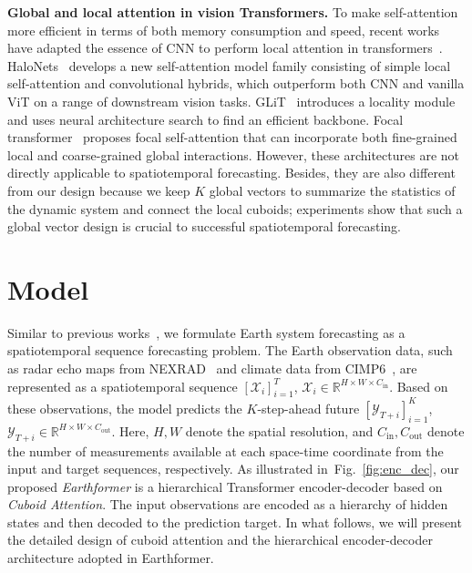 \documentclass{article}
\newcommand{\figref}[1]{Fig.~\ref{#1}}
\renewcommand{\paragraph}[1]{\textbf{#1. }}
\begin{document}
\paragraph{Global and local attention in vision Transformers}
To make self-attention more efficient in terms of both memory consumption and speed, recent works have adapted the essence of CNN to perform local attention in transformers~\cite{TNT,ying2021transformers}. HaloNets~\cite{vaswani2021scaling} develops a new self-attention model family consisting of simple local self-attention and convolutional hybrids, which outperform both CNN and vanilla ViT on a range of downstream vision tasks. GLiT~\cite{chen2021glit} introduces a locality module and uses neural architecture search to find an efficient backbone. Focal transformer~\cite{yang2021focal} proposes focal self-attention that can incorporate both fine-grained local and coarse-grained global interactions. 
However, these architectures are not directly applicable to spatiotemporal forecasting. Besides, they are also different from our design because we keep $K$ global vectors to summarize the statistics of the dynamic system and connect the local cuboids; experiments show that such a global vector design is crucial to successful spatiotemporal forecasting. 


\section{Model}
\label{sec:model}
Similar to previous works~\cite{shi2015convolutional, veillette2020sevir, bai2022rainformer}, we formulate Earth system forecasting as a spatiotemporal sequence forecasting problem. The Earth observation data, such as radar echo maps from NEXRAD~\cite{heiss1990nexrad} and climate data from CIMP6~\cite{eyring2016overview}, are represented as a spatiotemporal sequence
$[\mathcal{X}_{i}]_{i=1}^T$, $\mathcal{X}_i \in \mathbb{R}^{H\times W\times C_{\text{in}}}$. 
Based on these observations, the model predicts the $K$-step-ahead future
$[\mathcal{Y}_{T+i}]_{i=1}^K$, $\mathcal{Y}_{T+i} \in \mathbb{R}^{H\times W\times C_{\text{out}}}$. 
Here, $H, W$ denote the spatial resolution, and $C_{\text{in}}, C_{\text{out}}$ denote the number of measurements available at each space-time coordinate from the input and target sequences, respectively. As illustrated in~\figref{fig:enc_dec}, our proposed \emph{Earthformer} is a hierarchical Transformer encoder-decoder based on \emph{Cuboid Attention}. The input observations are encoded as a hierarchy of hidden states and then decoded to the prediction target. In what follows, we will present the detailed design of cuboid attention and the hierarchical encoder-decoder architecture adopted in Earthformer.
\end{document}
